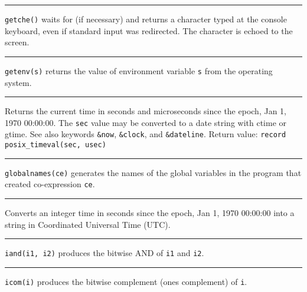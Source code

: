 \bigskip\hrule\vspace{0.1cm}

\noindent
\texttt{getche()} waits for (if necessary) and returns a character typed
at the console keyboard, even if standard input was redirected. The
character is echoed to the screen.

\bigskip\hrule\vspace{0.1cm}

\noindent
\texttt{getenv(s)} returns the value of environment variable \texttt{s} from the operating system.

\bigskip\hrule\vspace{0.1cm}

\noindent
{}Returns the current time in seconds and microseconds
since the epoch, Jan 1, 1970 00:00:00. The \texttt{sec} value may be
converted to a date string with ctime or gtime. See also keywords
\texttt{\&now}, \texttt{\&clock}, and \texttt{\&dateline}. Return
value: \texttt{record posix\_timeval(sec, usec)} 

\bigskip\hrule\vspace{0.1cm}

\noindent
{}\texttt{globalnames(ce)} generates the names of the global
variables in the program that created co-expression \texttt{ce}.

\bigskip\hrule\vspace{0.1cm}

\noindent
Converts an integer time in seconds since the epoch, Jan 1, 1970
00:00:00 into a string in Coordinated Universal Time (UTC). 

\bigskip\hrule\vspace{0.1cm}

\noindent
{}\texttt{iand(i1, i2)} produces the bitwise AND of
\texttt{i1} and \texttt{i2}.

\bigskip\hrule\vspace{0.1cm}

\noindent
\texttt{icom(i)} produces the bitwise complement (one{\textquotesingle}s
complement) of \texttt{i}.

